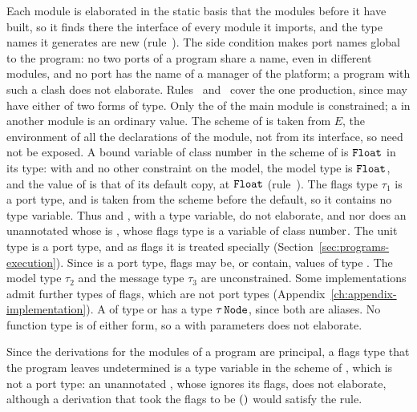\begin{rulecomments}
 Each module is elaborated in the static basis that
the modules before it have built, so it finds there the interface of every
module it imports, and the type names it generates are new
(rule~). The side condition makes port names global to
the program: no two ports of a program share a name, even in different
modules, and no port has the name of a manager of the platform; a program
with such a clash does not elaborate. %
 Rules~
and~ cover the one production, since 
may have either of two forms of type. Only the  of the main module
is constrained; a  in another module is an ordinary value. %
The scheme of  is taken from $E$, the environment of all the
declarations of the module, not from its interface, so  need not be
exposed. %
A bound variable of class $\mathrm{number}$ in the scheme of  is $\mathtt{Float}$ in
its type: with  and no other
constraint on the model, the model type is $\mathtt{Float}$, and the value of
 is that of its default copy, at $\mathtt{Float}$
(rule~). %
The flags type $\tau_1$ is a port type, and is taken from the scheme before
the default, so it contains no type variable. Thus
 and
, with  a type variable, do not
elaborate, and nor does an unannotated  whose  is
, whose flags type is a variable of
class $\mathrm{number}$. %
The unit type is a port type, and as flags it is
treated specially (Section~\ref{sec:programs-execution}). Since 
is a port type, flags may be, or contain, values of type . %
The model type $\tau_2$ and the message type $\tau_3$ are unconstrained. Some
implementations admit further types of flags, which are not port types
(Appendix~\ref{ch:appendix-implementation}).
 A  of type  or
 has a type $\tau\,\mathtt{Node}$, since both are aliases. No function
type is of either form, so a  with parameters does not elaborate. %
\end{rulecomments}

Since the derivations for the modules of a program are principal, a flags
type that the program leaves undetermined is a type variable in the scheme of
, which is not a port type: an unannotated
,
whose  ignores its flags, does not elaborate, although a derivation
that took the flags to be $\mathtt{()}$ would satisfy the rule. %

